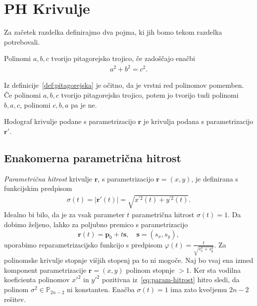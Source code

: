 \documentclass[isrm2, tisk]{fmfdelo}
\newcommand{\R}{\mathbb R}
\newcommand{\p}{\mathbf{p}}
\begin{document}
    \section{PH Krivulje}
    Za začetek razdelka definirajmo dva pojma, ki jih bomo tekom razdelka potrebovali.
    \begin{definicija}
        \label{def:pitagorejska}
        Polinomi $a,b,c$ tvorijo pitagorejsko trojico, če zadoščajo enačbi
        \begin{align*}
            a^2+b^2=c^2.
        \end{align*}
    \end{definicija}
    \begin{opomba}
        Iz definicije~\ref{def:pitagorejska} je očitno, da je vrstni red polinomov pomemben.
        Če polinomi $a,b,c$ tvorijo pitagorejsko trojico, potem jo tvorijo tudi polinomi $b,a,c$, polinomi $c,b,a$ pa je ne.
    \end{opomba}
    \begin{definicija}
        Hodograf krivulje podane s parametrizacijo $\mathbf{r}$ je krivulja podana s parametrizacijo $\mathbf{r'}$.
    \end{definicija}

    \subsection{Enakomerna parametrična hitrost}
    \textit{Parametrična hitrost} krivulje $\mathbf{r}$, s parametrizacijo $\mathbf{r}= \left(x,y\right)$, je definirana s funkcijskim predpisom
    \begin{align}
        \sigma(t)= |\mathbf{r'}(t)| = \sqrt {x^{'2}(t)+y^{'2}(t)}. \label{eq:param-hitrost}
    \end{align}
    Idealno bi bilo, da je za vsak parameter $t$ parametrična hitrost $\sigma(t) = 1$.
    Da dobimo željeno, lahko za poljubno premico s parametrizacijo
    \[\mathbf{r}(t) = \p_0 + t\mathbf{s},\quad  \mathbf{s} = (s_x,s_y),\]
    uporabimo reparametrizacijsko funkcijo s predpisom $\varphi(t) = \frac{t}{\sqrt{s_x^2+s_y^2}}$.
    Za polinomske krivulje stopnje višjih stopenj pa to ni mogoče.
    Naj bo vsaj ena izmed komponent parametrizacije $\mathbf{r}=(x,y)$ polinom stopnje $>1$.
    Ker sta vodilna koeficienta polinomov $x'^2$ in $y'^2$ pozitivna iz~\eqref{eq:param-hitrost} hitro sledi, da polinom $\sigma^2\in\mathbb{P}_{2n-2}$ ni konstanten.
    Enačba $\sigma(t) = 1$ ima zato kvečjemu $2n-2$ rešitev.
\end{document}
